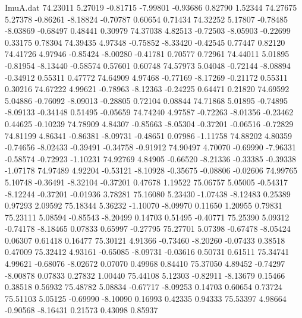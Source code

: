 \begin{filecontents}{ImuA.dat}
  74.23011    5.27019   -0.81715   -7.99801   -0.93686    0.82790    1.52344
  74.27675    5.27378   -0.86261   -8.18824   -0.70787    0.60654    0.71434
  74.32252    5.17807   -0.78485   -8.03869   -0.68497    0.48441    0.30979
  74.37038    4.82513   -0.72503   -8.05903   -0.22699    0.33175    0.78304
  74.39435    4.97348   -0.75852   -8.33420   -0.42545    0.77447    0.82120
  74.41726    4.97946   -0.85424   -8.00280   -0.41781    0.70577    0.72961
  74.44011    5.01895   -0.81954   -8.13440   -0.58574    0.57601    0.60748
  74.57973    5.04048   -0.72144   -8.08894   -0.34912    0.55311    0.47772
  74.64909    4.97468   -0.77169   -8.17269   -0.21172    0.55311    0.30216
  74.67222    4.99621   -0.78963   -8.12363   -0.24225    0.64471    0.21820
  74.69592    5.04886   -0.76092   -8.09013   -0.28805    0.72104    0.08844
  74.71868    5.01895   -0.74895   -8.09133   -0.34148    0.51495   -0.05659
  74.74240    4.97587   -0.72263   -8.01356   -0.23462    0.44625   -0.10239
  74.78909    4.84307   -0.85663   -8.05304   -0.37201   -0.06516   -0.72829
  74.81199    4.86341   -0.86381   -8.09731   -0.48651    0.07986   -1.11758
  74.88202    4.80359   -0.74656   -8.02433   -0.39491   -0.34758   -0.91912
  74.90497    4.70070   -0.69990   -7.96331   -0.58574   -0.72923   -1.10231
  74.92769    4.84905   -0.66520   -8.21336   -0.33385   -0.39338   -1.07178
  74.97489    4.92204   -0.53121   -8.10928   -0.35675   -0.08806   -0.02606
  74.99765    5.10748   -0.36491   -8.32104   -0.37201    0.47678    1.19522
  75.06757    5.05005   -0.54317   -8.12244   -0.37201   -0.01936    3.78281
  75.16080    5.23430   -1.07438   -8.12483    0.25389    0.97293    2.09592
  75.18344    5.36232   -1.10070   -8.09970    0.11650    1.20955    0.79831
  75.23111    5.08594   -0.85543   -8.20499    0.14703    0.51495   -0.40771
  75.25390    5.09312   -0.74178   -8.18465    0.07833    0.65997   -0.27795
  75.27701    5.07398   -0.67478   -8.05424    0.06307    0.61418    0.16477
  75.30121    4.91366   -0.73460   -8.20260   -0.07433    0.38518    0.47009
  75.32412    4.93161   -0.65085   -8.09731   -0.03616    0.50731    0.61511
  75.34741    4.99621   -0.68076   -8.02672    0.07070    0.49968    0.84410
  75.37050    4.89452   -0.74297   -8.00878    0.07833    0.27832    1.00440
  75.44108    5.12303   -0.82911   -8.13679    0.15466    0.38518    0.56932
  75.48782    5.08834   -0.67717   -8.09253    0.14703    0.60654    0.73724
  75.51103    5.05125   -0.69990   -8.10090    0.16993    0.42335    0.94333
  75.53397    4.98664   -0.90568   -8.16431    0.21573    0.43098    0.85937

\end{filecontents}
